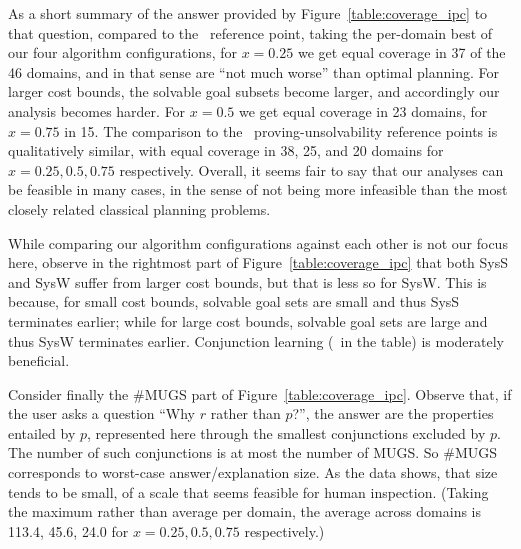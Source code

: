As a short summary of the answer provided by
Figure~\ref{table:coverage_ipc} to that question, compared to
the \hlmcut\ reference point, taking the per-domain best of our four
algorithm configurations, for $x=0.25$ we get equal coverage in 37 of
the 46 domains, and in that sense are ``not much worse'' than optimal
planning. For larger cost bounds, the solvable goal subsets become
larger, and accordingly our analysis becomes harder. For $x=0.5$ we
get equal coverage in 23 domains, for $x=0.75$ in 15. The comparison
to the \hc\ proving-unsolvability reference points is qualitatively
similar, with equal coverage in 38, 25, and 20 domains for $x=0.25,
0.5, 0.75$ respectively. Overall, it seems fair to say that our
analyses can be feasible in many cases, in the sense of not being more
infeasible than the most closely related classical planning problems.

While comparing our algorithm configurations against each other is not
our focus here, observe in the rightmost part of
Figure~\ref{table:coverage_ipc} that both SysS and SysW suffer from
larger cost bounds, but that is less so for SysW. This is because, for
small cost bounds, solvable goal sets are small and thus SysS
terminates earlier; while for large cost bounds, solvable goal sets
are large and thus SysW terminates earlier. Conjunction learning (\hc\
in the table) is moderately beneficial.
%
%

Consider finally the \#MUGS part of
Figure~\ref{table:coverage_ipc}. Observe that, if the user asks a
question ``Why $r$ rather than $p$?'', the answer are the properties
entailed by $p$, represented here through the smallest conjunctions
excluded by $p$. The number of such conjunctions is at most the number
of MUGS. So \#MUGS corresponds to worst-case answer/explanation
size. As the data shows, that size tends to be small, of a scale that
seems feasible for human inspection. (Taking the maximum rather than
average per domain, the average across domains is 113.4, 45.6, 24.0
for $x=0.25, 0.5, 0.75$ respectively.)

